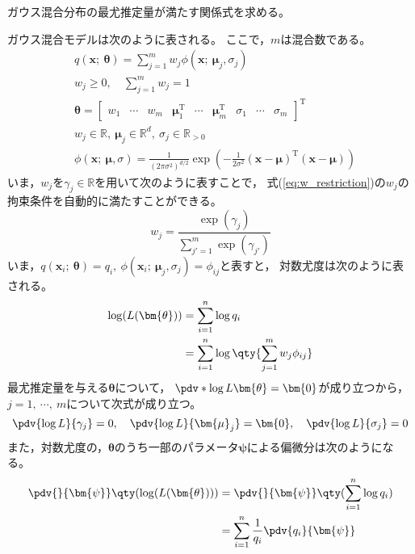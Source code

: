 \documentclass[class=jsarticle, crop=false, dvipdfmx, fleqn]{standalone}
\begin{document}
\section{}

ガウス混合分布の最尤推定量が満たす関係式を求める。

ガウス混合モデルは次のように表される。
ここで，\(m\)は混合数である。
\begin{align}
    & q(\bm{x};\ \bm{\theta})
        = \sum_{j=1}^{m} w_j \phi(\bm{x};\ \bm{\mu}_j, \sigma_j) \\
    & w_j \ge 0, \quad \sum_{j=1}^{m} w_j = 1
        \label{eq:w_restriction} \\
    & \bm{\theta} =
        \begin{bmatrix}
            w_1 & \cdots & w_m
            & \bm{\mu}_1^\mathrm{T} & \cdots & \bm{\mu}_m^\mathrm{T}
            & \sigma_1 & \cdots & \sigma_m
        \end{bmatrix}^\mathrm{T} \\
    & w_j \in \mathbb{R},\ \bm{\mu}_j \in \mathbb{R}^d,\ \sigma_j \in \mathbb{R}_{>0} \\
    & \phi(\bm{x};\ \bm{\mu}, \sigma)
        = \frac{1}{(2\pi\sigma^2)^{d/2}} \exp(-\frac{1}{2\sigma^2} (\bm{x}-\bm{\mu})^\mathrm{T}(\bm{x}-\bm{\mu}))
\end{align}
いま，\(w_j\)を\(\gamma_j \in \mathbb{R}\)を用いて次のように表すことで，
式(\ref{eq:w_restriction})の\(w_j\)の拘束条件を自動的に満たすことができる。
\begin{equation}
    w_j = \frac{\exp(\gamma_j)}{\sum_{j'=1}^{m} \exp(\gamma_{j'})}
        \label{eq:gamma2w}
\end{equation}
いま，\(q(\bm{x}_i;\ \bm{\theta}) = q_i,\ \phi(\bm{x}_i;\ \bm{\mu}_j, \sigma_j) = \phi_{ij}\)と表すと，
対数尤度は次のように表される。
\begin{align}
    \log(L(\bm{\theta}))
        & = \sum_{i=1}^{n} \log{q_i} \\
        & = \sum_{i=1}^{n} \log\qty{\sum_{j=1}^{m} w_j \phi_{ij}}
\end{align}
最尤推定量を与える\(\bm{\theta}\)について，
\(\pdv*{\log{L}}{\bm{\theta}} = \bm{0}\)が成り立つから，
\(j = 1,\ \cdots,\ m\)について次式が成り立つ。
\begin{equation}
    \pdv{\log{L}}{\gamma_j} = 0, \quad
    \pdv{\log{L}}{\bm{\mu}_j} = \bm{0}, \quad
    \pdv{\log{L}}{\sigma_j} = 0
\end{equation}
また，対数尤度の，\(\bm{\theta}\)のうち一部のパラメータ\(\bm{\psi}\)による偏微分は次のようになる。
\begin{align}
    \pdv{}{\bm{\psi}} \qty(\log(L(\bm{\theta})))
        & = \pdv{}{\bm{\psi}} \qty(\sum_{i=1}^{n} \log{q_i}) \\
        & = \sum_{i=1}^{n} \frac{1}{q_i} \pdv{q_i}{\bm{\psi}}
            \label{eq:pdv_ll_general}
\end{align}
\end{document}
